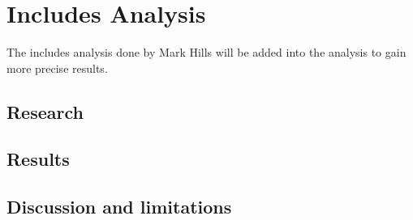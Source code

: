 \documentclass[../main.tex]{subfiles}
\begin{document}
    \section{Includes Analysis}\label{sec:includes_analysis}
        The includes analysis done by Mark Hills will be added into the analysis to gain more precise results.
    
    \subsection{Research}\label{subsec:ia_research}

    \subsection{Results}\label{subsec:ia_results}

    \subsection{Discussion and limitations}\label{subsec:ia_discussion}
\end{document}
